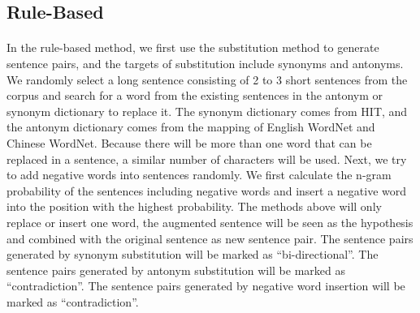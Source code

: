\documentclass{article}
\begin{document}
\begin{CJK*}{UTF8}{bkai}
\subsection{Rule-Based}
\paragraph{}
In the rule-based method, we first use the substitution method to generate sentence pairs, and the targets of substitution include synonyms and antonyms. We randomly select a long sentence consisting of 2 to 3 short sentences from the corpus and search for a word from the existing sentences in the antonym or synonym dictionary to replace it. The synonym dictionary comes from HIT, and the antonym dictionary comes from the mapping of English WordNet and Chinese WordNet. Because there will be more than one word that can be replaced in a sentence, a similar number of characters will be used. Next, we try to add negative words into sentences randomly. We first calculate the n-gram probability of the sentences including negative words and insert a negative word into the position with the highest probability. The methods above will only replace or insert one word, the augmented sentence will be seen as the hypothesis and combined with the original sentence as new sentence pair. The sentence pairs generated by synonym substitution will be marked as ``bi-directional''. The sentence pairs generated by antonym substitution will be marked as ``contradiction''. The sentence pairs generated by negative word insertion will be marked as ``contradiction''.


\end{CJK*}
\end{document}
